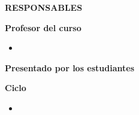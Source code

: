   \thispagestyle{estiloresponsables}

  \vspace*{0.5cm}

  {\noindent \fontsize{12pt}{16pt}\selectfont \textbf{RESPONSABLES}}

  \vspace{0.8cm}

  {\noindent \textbf{Profesor del curso}}
  \begin{itemize}
    \item \docente
  \end{itemize}

  \vspace{0.6cm}

  {\noindent \textbf{Presentado por los estudiantes}}
  \begin{itemize}
    \estudiantes
  \end{itemize}

  \vspace{0.6cm}

  {\noindent \textbf{Ciclo}}
  \begin{itemize}
    \item \ciclo
  \end{itemize}

  \vfill
  \newpage
\else
  \newpage
  \setcounter{page}{2}
\fi

